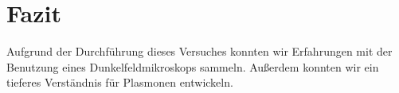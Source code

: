 
\chapter{Fazit}
\label{chap:fazit}

Aufgrund der Durchführung dieses Versuches konnten wir Erfahrungen mit der Benutzung eines Dunkelfeldmikroskops sammeln. Außerdem konnten wir ein tieferes Verständnis für Plasmonen entwickeln.

